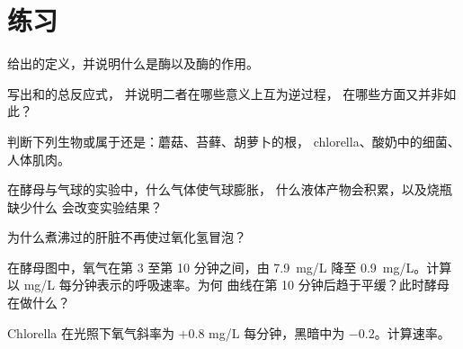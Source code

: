 \section{练习}

\begin{exercise}[$\star$]\label{exo:g10:cell-metabolism:1}
给出的定义，并说明什么是酶以及酶的作用。
\end{exercise}

\begin{exercise}[$\star$]\label{exo:g10:cell-metabolism:2}
写出和的总反应式，
并说明二者在哪些意义上互为逆过程，
在哪些方面又并非如此？
\end{exercise}

\begin{exercise}[$\star$]\label{exo:g10:cell-metabolism:3}
判断下列生物或属于还是：蘑菇、苔藓、胡萝卜的根，
chlorella、酸奶中的细菌、人体肌肉。
\end{exercise}

\begin{exercise}[$\star$]\label{exo:g10:cell-metabolism:4}
在酵母与气球的实验中，什么气体使气球膨胀，
什么液体产物会积累，以及烧瓶缺少什么
会改变实验结果？
\end{exercise}

\begin{exercise}[$\star$]\label{exo:g10:cell-metabolism:5}
为什么煮沸过的肝脏不再使过氧化氢冒泡？
\end{exercise}

\begin{exercise}[$\star\star$]\label{exo:g10:cell-metabolism:6}
在酵母图中，氧气在第 3 至第 10 分钟之间，由 \qty{7.9}{mg/L} 降至
\qty{0.9}{mg/L}。计算
以 \unit{mg/L} 每分钟表示的呼吸速率。为何
曲线在第 10 分钟后趋于平缓？此时酵母在做什么？
\end{exercise}

\begin{exercise}[$\star\star$]\label{exo:g10:cell-metabolism:7}
Chlorella 在光照下氧气斜率为 $+0.8$ \unit{mg/L}
每分钟，黑暗中为 $-0.2$。计算速率。
\end{exercise}

